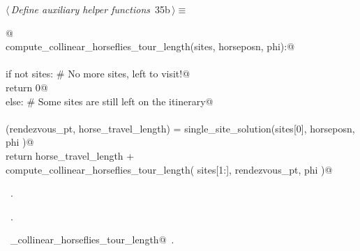 \documentclass[11.5pt]{report}
\begin{document}
\begin{center}
\end{center}

\begin{flushleft} \small\label{scrap30}\raggedright\small
{} $\langle\,${\itshape Define auxiliary helper functions}\nobreak\ {\footnotesize {35b}}$\,\rangle\equiv$
\vspace{-1ex}
\begin{list}{}{} \item
\mbox{}\verb@   @\\
\mbox{}\verb@def compute_collinear_horseflies_tour_length(sites, horseposn, phi):@\\
\mbox{}\verb@@\\
\mbox{}\verb@     if not sites: # No more sites, left to visit!@\\
\mbox{}\verb@          return 0@\\
\mbox{}\verb@     else:         # Some sites are still left on the itinerary@\\
\mbox{}\verb@@\\
\mbox{}\verb@          (rendezvous_pt, horse_travel_length) = single_site_solution(sites[0], horseposn, phi )@\\
\mbox{}\verb@          return horse_travel_length  + \@\\
\mbox{}\verb@                 compute_collinear_horseflies_tour_length( sites[1:], rendezvous_pt, phi )@\\
\mbox{}\verb@@{\NWsep}
\end{list}
\vspace{-1.5ex}
\footnotesize
\begin{list}{}{\setlength{\itemsep}{-\parsep}\setlength{\itemindent}{-\leftmargin}}
\item \NWtxtMacroDefBy\ .
\item \NWtxtMacroRefIn\ .
\item \NWtxtIdentsDefed\nobreak\  \verb@compute_collinear_horseflies_tour_length@\nobreak\ .
\item{}
\end{list}
\vspace{4ex}
\end{flushleft}
\newchunk 
\end{document}
